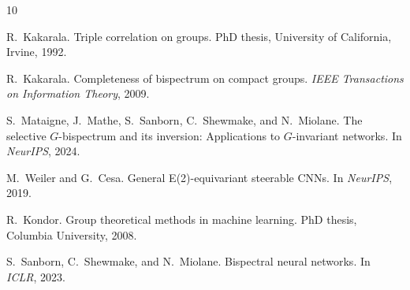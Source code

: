 \documentclass{article}
\theoremstyle{definition}
\theoremstyle{remark}
\begin{document}
\begin{thebibliography}{10}

R.~Kakarala.
\newblock Triple correlation on groups.
\newblock PhD thesis, University of California, Irvine, 1992.

R.~Kakarala.
\newblock Completeness of bispectrum on compact groups.
\newblock \textit{IEEE Transactions on Information Theory}, 2009.

S.~Mataigne, J.~Mathe, S.~Sanborn, C.~Shewmake, and N.~Miolane.
\newblock The selective {$G$}-bispectrum and its inversion: Applications to {$G$}-invariant networks.
\newblock In \textit{NeurIPS}, 2024.

M.~Weiler and G.~Cesa.
\newblock General {E(2)}-equivariant steerable {CNNs}.
\newblock In \textit{NeurIPS}, 2019.

R.~Kondor.
\newblock Group theoretical methods in machine learning.
\newblock PhD thesis, Columbia University, 2008.

S.~Sanborn, C.~Shewmake, and N.~Miolane.
\newblock Bispectral neural networks.
\newblock In \textit{ICLR}, 2023.

\end{thebibliography}
\end{document}
